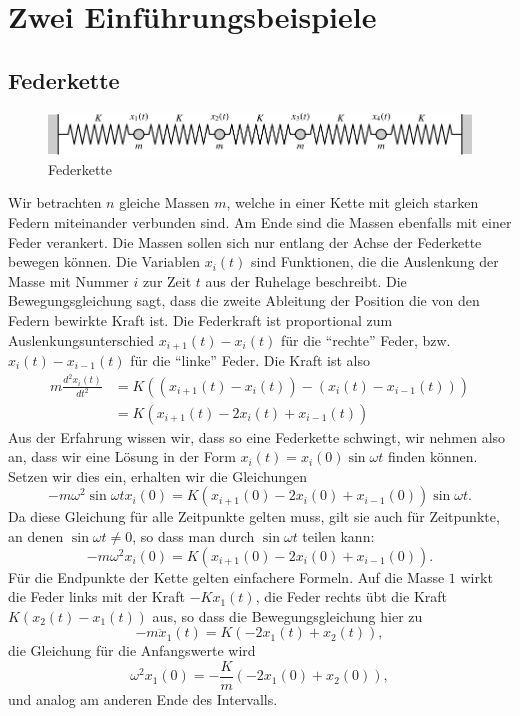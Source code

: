 %
%
%
\section{Zwei Einführungsbeispiele}
\subsection{Federkette}
\begin{figure}
\begin{center}
\includegraphics[width=\hsize]{images/e-1}
\end{center}
\caption{Federkette}
\end{figure}
Wir betrachten $n$ gleiche Massen $m$, welche in einer Kette mit gleich
starken Federn miteinander verbunden sind.
Am Ende sind die Massen
ebenfalls mit einer Feder verankert.
Die Massen sollen sich nur entlang der Achse der Federkette bewegen können.
Die Variablen $x_i(t)$ sind Funktionen, die die Auslenkung der Masse mit
Nummer $i$ zur Zeit $t$ aus der Ruhelage beschreibt.
Die Bewegungsgleichung sagt,
dass die zweite Ableitung der Position die von den Federn bewirkte Kraft
ist.
Die Federkraft ist proportional zum Auslenkungsunterschied
$x_{i+1}(t)-x_i(t)$ für die ``rechte'' Feder, bzw.~
$x_{i}(t)-x_{i-1}(t)$ für die ``linke'' Feder.
Die Kraft ist also
\begin{align*}
m\frac{d^2x_i(t)}{dt^2}
&=K((x_{i+1}(t)-x_i(t))-(x_i(t)-x_{i-1}(t)))\\
&=K(x_{i+1}(t)-2x_i(t)+x_{i-1}(t))
\end{align*}
Aus der Erfahrung wissen wir, dass so eine Federkette schwingt, wir nehmen also
an, dass wir eine Lösung in der Form $x_i(t)=x_i(0)\sin\omega t$ finden
können.
Setzen wir dies ein, erhalten wir die Gleichungen
\[
-m\omega^2\sin\omega t x_i(0)=K(x_{i+1}(0)-2x_i(0)+x_{i-1}(0))\sin\omega t.
\]
Da diese Gleichung für alle Zeitpunkte gelten muss, gilt sie auch für
Zeitpunkte, an denen $\sin\omega t\ne 0$, so dass man durch $\sin\omega t$
teilen kann:
\[
-m\omega^2 x_i(0)=K(x_{i+1}(0)-2x_i(0)+x_{i-1}(0)).
\]
Für die Endpunkte der Kette gelten einfachere Formeln.
Auf die Masse $1$
wirkt die Feder links mit der Kraft $-Kx_1(t)$, die Feder rechts übt die
Kraft $K(x_2(t)-x_1(t))$ aus, so dass die Bewegungsgleichung hier zu
\[
-m\ddot x_1(t)=K(-2x_1(t)+x_2(t)),
\]
die Gleichung für die Anfangswerte wird
\[
\omega^2 x_1(0)=-\frac{K}{m}(-2x_1(0)+x_2(0)),
\]
und analog am anderen Ende des Intervalls.

